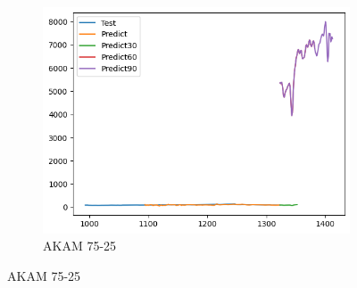 \documentclass{ieeeojies}
\begin{document}
\begin{figure}[htbp]
\begin{subfigure}[b]{0.33\linewidth}
        \includegraphics[width=\linewidth]{AddRNN Plot/AddRNN_AKAM_75_25.png}
        \caption{AKAM 75-25}
        \label{fig:akam-75-25}
    \end{subfigure}
\end{figure}
 \vspace{-20pt}
\end{document}
